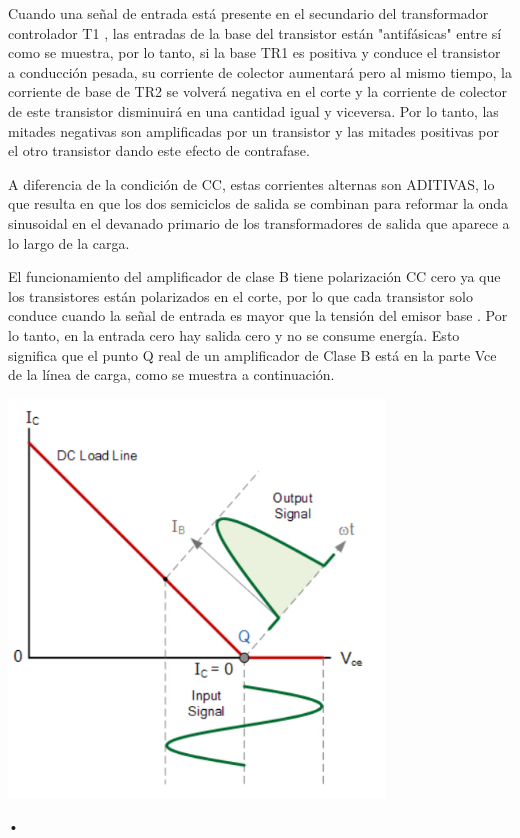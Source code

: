 \documentclass[12pt,a4paper]{article}
\begin{document}
\begin{flushleft}
Cuando una señal de entrada está presente en el secundario del transformador controlador T1 , las entradas de la base del transistor están "antifásicas" entre sí como se muestra, por lo tanto, si la base TR1 es positiva y conduce el transistor a conducción pesada, su corriente de colector aumentará pero al mismo tiempo, la corriente de base de TR2 se volverá negativa en el corte y la corriente de colector de este transistor disminuirá en una cantidad igual y viceversa. Por lo tanto, las mitades negativas son amplificadas por un transistor y las mitades positivas por el otro transistor dando este efecto de contrafase.

A diferencia de la condición de CC, estas corrientes alternas son ADITIVAS, lo que resulta en que los dos semiciclos de salida se combinan para reformar la onda sinusoidal en el devanado primario de los transformadores de salida que aparece a lo largo de la carga.

El funcionamiento del amplificador de clase B tiene polarización CC cero ya que los transistores están polarizados en el corte, por lo que cada transistor solo conduce cuando la señal de entrada es mayor que la tensión del emisor base . Por lo tanto, en la entrada cero hay salida cero y no se consume energía. Esto significa que el punto Q real de un amplificador de Clase B está en la parte Vce de la línea de carga, como se muestra a continuación.

\end{flushleft}
\includegraphics[width=10cm]{3.jpg} 
\begin{flushleft}
•
\end{flushleft}
\end{document}
